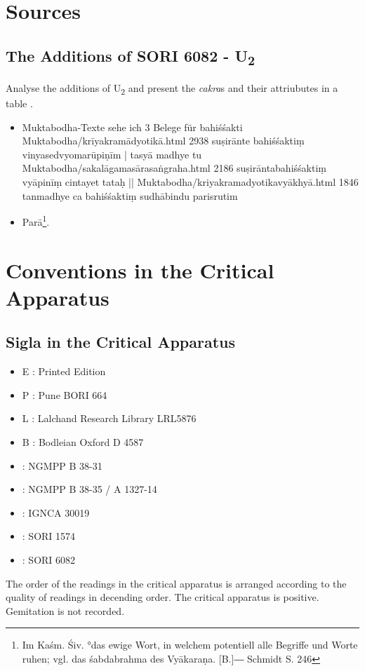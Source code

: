 \chapter{Sources}
\section{The Additions of  SORI 6082 - U\textsubscript{2}}
\label{discussionu2}
Analyse the additions of U\textsubscript{2} and present the \textit{cakra}s and their attriubutes in a table .
\begin{itemize}
\item  Muktabodha-Texte sehe ich 3 Belege für bahiśśakti Muktabodha/krīyakramādyotikā.html 2938 suṣirānte bahiśśaktiṃ vinyasedvyomarūpiṇīm | tasyā madhye tu Muktabodha/sakalāgamasārasaṅgraha.html 2186 suṣirāntabahiśśaktiṃ vyāpinīṃ cintayet tataḥ || Muktabodha/kriyakramadyotikavyākhyā.html 1846 tanmadhye ca bahiśśaktiṃ sudhābindu parisrutim
  \item  Parā\footnote{Im Kaśm. Śiv. °das ewige Wort, in welchem potentiell alle Begriffe und Worte ruhen; vgl. das śabdabrahma des Vyākaraṇa. [B.]― Schmidt S. 246}.
  \end{itemize}

\chapter{Conventions in the Critical Apparatus}
\section{Sigla in the Critical Apparatus}

\begin{itemize}
\item E : Printed Edition
\item P : Pune BORI 664
\item L : Lalchand Research Library LRL5876
\item B : Bodleian Oxford D 4587
\item \None : NGMPP B 38-31
\item \Ntwo : NGMPP B 38-35 / A 1327-14
\item \Done : IGNCA 30019
\item \Uone : SORI 1574
\item \Utwo: SORI 6082
\end{itemize}

The order of the readings in the critical apparatus is arranged according to the quality of readings in decending order. The critical apparatus is positive. Gemitation is not recorded. 

